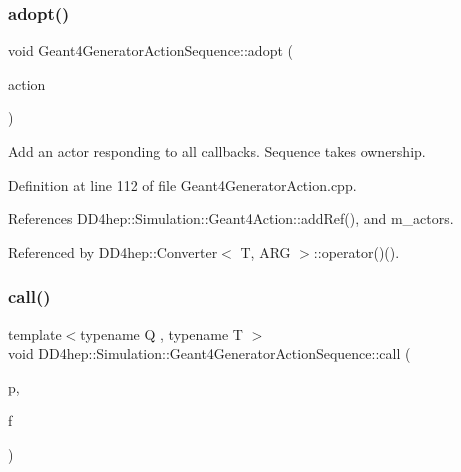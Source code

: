 \subsubsection{\texorpdfstring{adopt()}{adopt()}}
{\footnotesize\ttfamily void Geant4\+Generator\+Action\+Sequence\+::adopt (\begin{DoxyParamCaption}\item[{\hyperlink{class_d_d4hep_1_1_simulation_1_1_geant4_generator_action}{Geant4\+Generator\+Action} $\ast$}]{action }\end{DoxyParamCaption})}



Add an actor responding to all callbacks. Sequence takes ownership. 



Definition at line 112 of file Geant4\+Generator\+Action.\+cpp.



References D\+D4hep\+::\+Simulation\+::\+Geant4\+Action\+::add\+Ref(), and m\+\_\+actors.



Referenced by D\+D4hep\+::\+Converter$<$ T, A\+R\+G $>$\+::operator()().

\hypertarget{class_d_d4hep_1_1_simulation_1_1_geant4_generator_action_sequence_acec7af6b593bd3e1105abea622ea7127}{}\label{class_d_d4hep_1_1_simulation_1_1_geant4_generator_action_sequence_acec7af6b593bd3e1105abea622ea7127} 
\subsubsection{\texorpdfstring{call()}{call()}}
{\footnotesize\ttfamily template$<$typename Q , typename T $>$ \\
void D\+D4hep\+::\+Simulation\+::\+Geant4\+Generator\+Action\+Sequence\+::call (\begin{DoxyParamCaption}\item[{Q $\ast$}]{p,  }\item[{void(T\+::$\ast$)(G4\+Event $\ast$)}]{f }\end{DoxyParamCaption})\hspace{0.3cm}{\ttfamily [inline]}}




